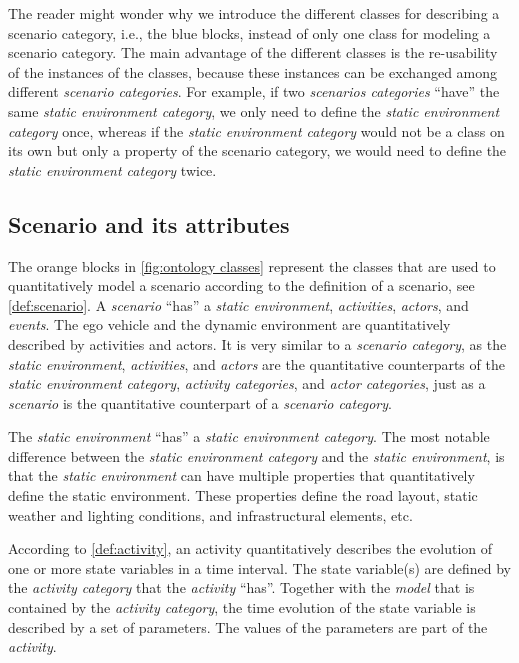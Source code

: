 
The reader might wonder why we introduce the different classes for describing a scenario category, i.e., the blue blocks, instead of only one class for modeling a scenario category. 
The main advantage of the different classes is the re-usability of the instances of the classes, because these instances can be exchanged among different \textit{scenario categories}. For example, if two \textit{scenarios categories} ``have'' the same \textit{static environment category}, we only need to define the \textit{static environment category} once, whereas if the \textit{static environment category} would not be a class on its own but only a property of the scenario category, we would need to define the \textit{static environment category} twice.



\subsection{Scenario and its attributes}
\label{sec:domain scenario}

The orange blocks in \cref{fig:ontology classes} represent the classes that are used to quantitatively model a scenario according to the definition of a scenario, see \cref{def:scenario}. A \textit{scenario} ``has'' a \textit{static environment}, \textit{activities}, \textit{actors}, and \textit{events}. 
The ego vehicle and the dynamic environment are quantitatively described by activities and actors. 
It is very similar to a \textit{scenario category}, as the \textit{static environment}, \textit{activities}, and \textit{actors} are the quantitative counterparts of the \textit{static environment category}, \textit{activity categories}, and \textit{actor categories}, just as a \textit{scenario} is the quantitative counterpart of a \textit{scenario category}. 

The \textit{static environment} ``has'' a \textit{static environment category}. The most notable difference between the \textit{static environment category} and the \textit{static environment}, is that the \textit{static environment} can have multiple properties that quantitatively define the static environment. These properties define the road layout, static weather and lighting conditions, and infrastructural elements, etc.

According to \cref{def:activity}, an activity quantitatively describes the evolution of one or more state variables in a time interval. The state variable(s) are defined by the \textit{activity category} that the \textit{activity} ``has''. Together with the \textit{model} that is contained by the \textit{activity category}, the time evolution of the state variable is described by a set of parameters. The values of the parameters are part of the \textit{activity}. 

